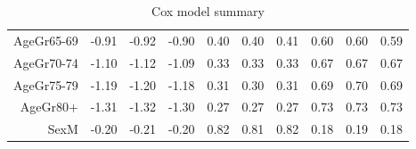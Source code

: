 \begin{table}[ht]
\begin{tabular}{rrrrrrrrrr}
  AgeGr65-69 & -0.91 & -0.92 & -0.90 & 0.40 & 0.40 & 0.41 & 0.60 & 0.60 & 0.59 \\ 
  AgeGr70-74 & -1.10 & -1.12 & -1.09 & 0.33 & 0.33 & 0.33 & 0.67 & 0.67 & 0.67 \\ 
  AgeGr75-79 & -1.19 & -1.20 & -1.18 & 0.31 & 0.30 & 0.31 & 0.69 & 0.70 & 0.69 \\ 
  AgeGr80+ & -1.31 & -1.32 & -1.30 & 0.27 & 0.27 & 0.27 & 0.73 & 0.73 & 0.73 \\ 
  SexM & -0.20 & -0.21 & -0.20 & 0.82 & 0.81 & 0.82 & 0.18 & 0.19 & 0.18 \\ 
   \hline
\end{tabular}
\caption{Cox model summary} 
\end{table}
